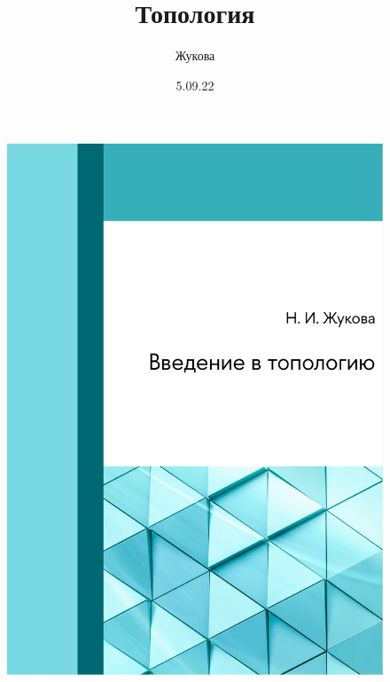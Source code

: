 \documentclass[a4paper]{article}
\author{Жукова}
\title{Топология}
\date{5.09.22}
\begin{document}
\begin{figure}
    \includegraphics{pictures/folio.pdf}
\end{figure}
\restoregeometry
\clearpage
\tableofcontents
\newpage






%








\end{document}
